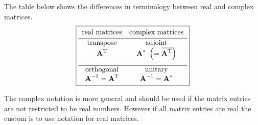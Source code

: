 The table below shows the differences in terminology between real and complex matrices.
\begin{equation}
\boxed{
\begin{array}{cc}
  \text{real matrices} & \text{complex matrices} \\\hline\hline
  \text{transpose} & \text{adjoint} \\
  \textbf{A}^{\mathrm{T}} & \textbf{A}^{\mathrm{*}} \  \left( = \overline{\textbf{A}^{\mathrm{T}}} \right) \\[10pt]\hline
  \text{orthogonal} & \text{unitary} \\
  \textbf{A}^{\mathrm{-1}}=\textbf{A}^{\mathrm{T}} & \textbf{A}^{\mathrm{-1}}=\textbf{A}^{\mathrm{*}}
\end{array}
}
\end{equation}

The complex notation is more general and should be used if the matrix entries are not restricted to be real numbers. However if all matrix entries are real the custom is to use notation for real matrices. 

\endinput